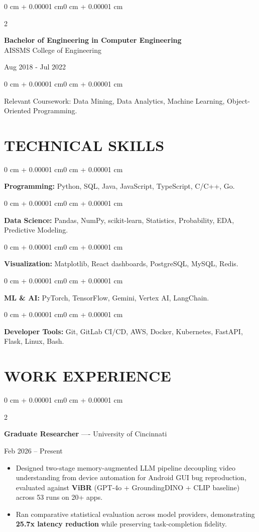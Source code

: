 \documentclass[10pt, letterpaper]{article}
\newenvironment{highlights}{
    \begin{itemize}[
        topsep=0.10 cm,
        parsep=0.06 cm,
        partopsep=0pt,
        itemsep=0.06 cm,
        leftmargin=12pt
    ]
}{
    \end{itemize}
}
\newenvironment{onecolentry}{
    \begin{adjustwidth}{0 cm + 0.00001 cm}{0 cm + 0.00001 cm}
}{
    \end{adjustwidth}
}
\newenvironment{twocolentry}[2][]{
    \onecolentry
    \def\secondColumn{#2}
    \setcolumnwidth{\fill, 4.5 cm}
    \begin{paracol}{2}
}{
    \switchcolumn \raggedleft \secondColumn
    \end{paracol}
    \endonecolentry
}
\begin{document}
\begin{twocolentry}{
    Aug 2018 - Jul 2022
}
    \textbf{Bachelor of Engineering in Computer Engineering} \\
    AISSMS College of Engineering
\end{twocolentry}
\begin{onecolentry}
Relevant Coursework: Data Mining, Data Analytics, Machine Learning, Object-Oriented Programming.
\end{onecolentry}
\section{TECHNICAL SKILLS}
\begin{onecolentry}
\textbf{Programming:} Python, SQL, Java, JavaScript, TypeScript, C/C++, Go.
\end{onecolentry}
\vspace{0.06 cm}
\begin{onecolentry}
\textbf{Data Science:} Pandas, NumPy, scikit-learn, Statistics, Probability, EDA, Predictive Modeling.
\end{onecolentry}
\vspace{0.06 cm}
\begin{onecolentry}
\textbf{Visualization:} Matplotlib, React dashboards, PostgreSQL, MySQL, Redis.
\end{onecolentry}
\vspace{0.06 cm}
\begin{onecolentry}
\textbf{ML \& AI:} PyTorch, TensorFlow, Gemini, Vertex AI, LangChain.
\end{onecolentry}
\vspace{0.06 cm}
\begin{onecolentry}
\textbf{Developer Tools:} Git, GitLab CI/CD, AWS, Docker, Kubernetes, FastAPI, Flask, Linux, Bash.
\end{onecolentry}

\section{WORK EXPERIENCE}
\begin{twocolentry}{Feb 2026 -- Present}
\textbf{Graduate Researcher} ---- University of Cincinnati
\end{twocolentry}
\begin{highlights}
  \item Designed two-stage memory-augmented LLM pipeline decoupling video understanding from device automation for Android GUI bug reproduction, evaluated against \textbf{ViBR} (GPT-4o + GroundingDINO + CLIP baseline) across 53 runs on 20+ apps.
  \item Ran comparative statistical evaluation across model providers, demonstrating \textbf{25.7x latency reduction} while preserving task-completion fidelity.
\end{highlights}
\end{document}

